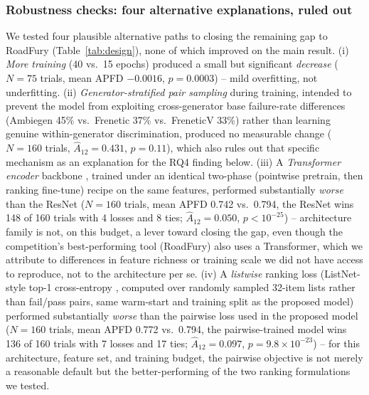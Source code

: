 \documentclass[smallextended]{svjour3}
\begin{document}
\subsubsection{Robustness checks: four alternative explanations, ruled out}
\label{sec:rq3-robustness}
We tested four plausible alternative paths to closing the remaining gap
to RoadFury (Table~\ref{tab:design}), none of which improved on the main
result. (i) \emph{More training} (40 vs.\ 15 epochs) produced a small but
significant \emph{decrease} ($N=75$ trials, mean APFD $-0.0016$,
$p=0.0003$) -- mild overfitting, not underfitting. (ii)
\emph{Generator-stratified pair sampling} during training, intended to
prevent the model from exploiting cross-generator base failure-rate
differences (Ambiegen 45\% vs.\ Frenetic 37\% vs.\ FreneticV 33\%) rather
than learning genuine within-generator discrimination, produced no
measurable change ($N=160$ trials, $\hat{A}_{12}=0.431$, $p=0.11$), which
also rules out that specific mechanism as an explanation for the RQ4
finding below. (iii) A \emph{Transformer encoder} backbone
\citep{vaswani2017attention}, trained under an identical two-phase
(pointwise pretrain, then ranking fine-tune) recipe on the same features,
performed substantially \emph{worse} than the ResNet ($N=160$ trials,
mean APFD 0.742 vs.\ 0.794, the ResNet wins 148 of 160 trials with 4
losses and 8 ties; $\hat{A}_{12}=0.050$, $p<10^{-25}$) -- architecture
family is not, on this budget, a lever toward closing the gap, even though
the competition's best-performing tool (RoadFury) also uses a Transformer,
which we attribute to differences in feature richness or training scale we
did not have access to reproduce, not to the architecture per se. (iv) A
\emph{listwise} ranking loss (ListNet-style top-1 cross-entropy
\citep{cao2007learning}, computed over randomly sampled 32-item lists
rather than fail/pass pairs, same warm-start and training split as the
proposed model) performed substantially \emph{worse} than the pairwise
loss used in the proposed model ($N=160$ trials, mean APFD 0.772 vs.\
0.794, the pairwise-trained model wins 136 of 160 trials with 7 losses
and 17 ties; $\hat{A}_{12}=0.097$, $p=9.8\times10^{-23}$) -- for this
architecture, feature set, and training budget, the pairwise objective is
not merely a reasonable default but the better-performing of the two
ranking formulations we tested.
\end{document}
